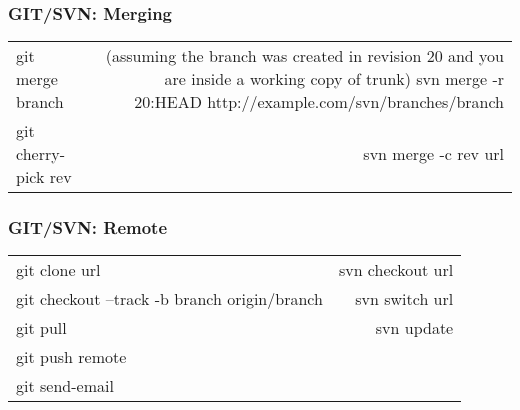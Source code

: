 \documentclass{beamer}
\begin{document}
\begin{frame}
\frametitle{GIT/SVN: Merging}
\begin{tabular}{ l r }
git merge branch & (assuming the branch was created in revision 20 and you are inside a working copy of trunk) svn merge -r 20:HEAD http://example.com/svn/branches/branch \\
git cherry-pick rev & svn merge -c rev url \\
\end{tabular}
\end{frame}

\begin{frame}
\frametitle{GIT/SVN: Remote}

\begin{tabular}{ l r }
git clone url & svn checkout url \\
git checkout --track -b branch origin/branch & svn switch url \\
git pull & svn update \\
git push remote & \\
git send-email & \\
\end{tabular}

\end{frame}

\end{document}
